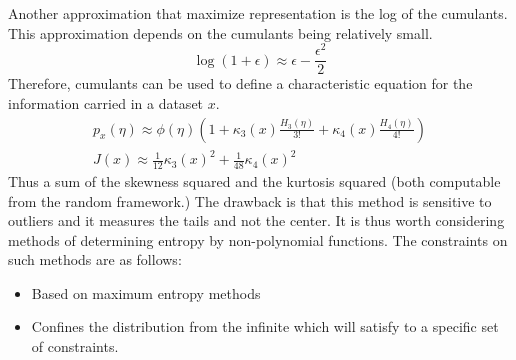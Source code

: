 \documentclass[12pt ]{article}
\begin{document}
Another approximation that maximize representation is the log of the cumulants.  This approximation depends on the cumulants being relatively small.  
\begin{equation}
\log (1 + \epsilon) \approx \epsilon - \frac{\epsilon ^2}{2}
\end{equation}
Therefore, cumulants can be used to define a characteristic equation for the information carried in a dataset $x$.
\begin{eqnarray}
	p_x(\eta) \approx \phi (\eta)(1 + \kappa_3 (x) \frac{H_3(\eta)} {3!}+ \kappa_4 (x) \frac{H_4(\eta)} {4!}) \\
J(x) \approx \frac{1}{12} \kappa_3 (x) ^2 + \frac{1}{48} \kappa_4 (x) ^2
\end{eqnarray}
Thus a sum of the skewness squared and the kurtosis squared (both computable from the random framework.)  The drawback is that this method is sensitive to outliers and it measures the tails and not the center.   It is thus worth considering methods of determining entropy by non-polynomial functions.   The constraints on such methods are as follows:
\begin{itemize}
\item Based on maximum entropy methods
\item Confines the distribution from the infinite  which will satisfy to a specific set of constraints.  
\end{itemize}
\end{document}
